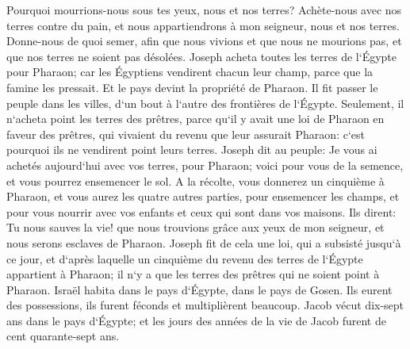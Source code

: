 \verse Pourquoi mourrions-nous sous tes yeux, nous et nos terres? Achète-nous avec nos terres contre du pain, et nous appartiendrons à mon seigneur, nous et nos terres. Donne-nous de quoi semer, afin que nous vivions et que nous ne mourions pas, et que nos terres ne soient pas désolées. 
\verse Joseph acheta toutes les terres de l`Égypte pour Pharaon; car les Égyptiens vendirent chacun leur champ, parce que la famine les pressait. Et le pays devint la propriété de Pharaon. 
\verse Il fit passer le peuple dans les villes, d`un bout à l`autre des frontières de l`Égypte. 
\verse Seulement, il n`acheta point les terres des prêtres, parce qu`il y avait une loi de Pharaon en faveur des prêtres, qui vivaient du revenu que leur assurait Pharaon: c`est pourquoi ils ne vendirent point leurs terres. 
\verse Joseph dit au peuple: Je vous ai achetés aujourd`hui avec vos terres, pour Pharaon; voici pour vous de la semence, et vous pourrez ensemencer le sol. 
\verse A la récolte, vous donnerez un cinquième à Pharaon, et vous aurez les quatre autres parties, pour ensemencer les champs, et pour vous nourrir avec vos enfants et ceux qui sont dans vos maisons. 
\verse Ils dirent: Tu nous sauves la vie! que nous trouvions grâce aux yeux de mon seigneur, et nous serons esclaves de Pharaon. 
\verse Joseph fit de cela une loi, qui a subsisté jusqu`à ce jour, et d`après laquelle un cinquième du revenu des terres de l`Égypte appartient à Pharaon; il n`y a que les terres des prêtres qui ne soient point à Pharaon. 
\verse Israël habita dans le pays d`Égypte, dans le pays de Gosen. Ils eurent des possessions, ils furent féconds et multiplièrent beaucoup. 
\verse Jacob vécut dix-sept ans dans le pays d`Égypte; et les jours des années de la vie de Jacob furent de cent quarante-sept ans. 
